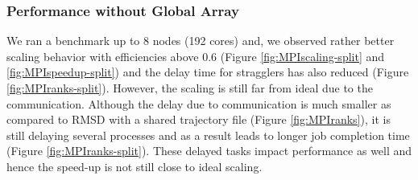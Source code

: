 \subsubsection*{Performance without Global Array}
We ran a benchmark up to 8 nodes (192 cores) and, we observed rather better scaling behavior with efficiencies above 0.6 (Figure \ref{fig:MPIscaling-split} and \ref{fig:MPIspeedup-split}) and the delay time for stragglers has also reduced (Figure \ref{fig:MPIranks-split}). 
However, the scaling is still far from ideal due to the communication. 
Although the delay due to communication is much smaller as compared to RMSD with a shared trajectory file (Figure \ref{fig:MPIranks}), it is still delaying several processes and as a result leads to longer job completion time (Figure \ref{fig:MPIranks-split}). 
These delayed tasks impact performance as well and hence the speed-up is not still close to ideal scaling.

